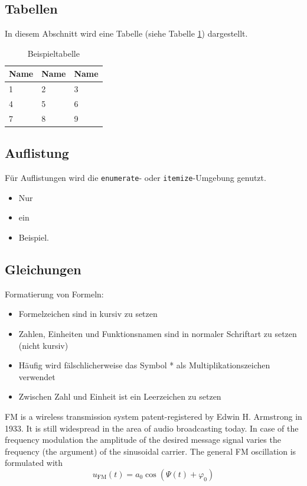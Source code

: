 \documentclass[conference]{IEEEtran}
\begin{document}
\subsection{Tabellen}
In diesem Abschnitt wird eine Tabelle (siehe Tabelle \ref{tab:beispiel}) dargestellt.

\begin{table}[!h]
	\centering
  \caption{Beispieltabelle}
	\label{tab:beispiel}
	\begin{tabular}{|l|l|l|}
		\hline
		\textbf{Name} & \textbf{Name} & \textbf{Name}\\
		\hline
		1 & 2 & 3\\
		\hline
		4 & 5 & 6\\
		\hline
		7 & 8 & 9\\
		\hline
	\end{tabular}	
\end{table}


\subsection{Auflistung}
Für Auflistungen wird die \texttt{enumerate}- oder \texttt{itemize}-Umgebung genutzt.

\begin{itemize}
	\item Nur
	\item ein
	\item Beispiel.
\end{itemize}


\subsection{Gleichungen}
Formatierung von Formeln:

\begin{itemize}
  \item Formelzeichen sind in kursiv zu setzen
  \item Zahlen, Einheiten und Funktionsnamen sind in normaler Schriftart zu setzen (nicht kursiv)
  \item Häufig wird fälschlicherweise das Symbol * als Multiplikationszeichen verwendet
  \item Zwischen Zahl und Einheit ist ein Leerzeichen zu setzen
\end{itemize}

\gls{FM} is a wireless transmission system patent-registered by Edwin H. Armstrong in 1933. It is still widespread in the area of audio broadcasting today. In case of the frequency modulation the amplitude of the desired message signal varies the frequency (the argument) of the sinusoidal carrier. The general \gls{FM} oscillation is formulated with 
\begin{equation}
u_{\textrm{FM}}(t)= a_0 \cos(\Psi(t)+\varphi_0) 
\label{eqn:fmosc}
\end{equation}
\end{document}
